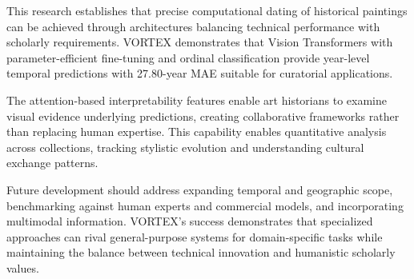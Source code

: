 \documentclass[10pt,twocolumn,letterpaper]{article}
\begin{document}
This research establishes that precise computational dating of historical paintings can be achieved through architectures balancing technical performance with scholarly requirements. VORTEX demonstrates that Vision Transformers with parameter-efficient fine-tuning and ordinal classification provide year-level temporal predictions with 27.80-year MAE suitable for curatorial applications.

The attention-based interpretability features enable art historians to examine visual evidence underlying predictions, creating collaborative frameworks rather than replacing human expertise. This capability enables quantitative analysis across collections, tracking stylistic evolution and understanding cultural exchange patterns.

Future development should address expanding temporal and geographic scope, benchmarking against human experts and commercial models, and incorporating multimodal information. VORTEX's success demonstrates that specialized approaches can rival general-purpose systems for domain-specific tasks while maintaining the balance between technical innovation and humanistic scholarly values.

{\small


}

\newpage
\end{document}
